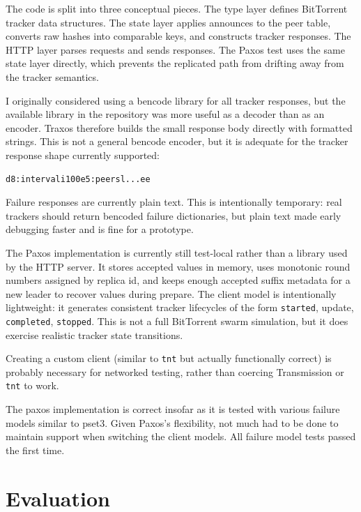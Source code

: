 \documentclass[letterpaper,twocolumn,10pt]{article}
\begin{document}
The code is split into three conceptual pieces. The type layer defines
BitTorrent tracker data structures. The state layer applies announces to
the peer table, converts raw hashes into comparable keys, and constructs
tracker responses. The HTTP layer parses requests and sends responses. The
Paxos test uses the same state layer directly, which prevents the
replicated path from drifting away from the tracker semantics.

I originally considered using a bencode library for all tracker responses,
but the available library in the repository was more useful as a decoder
than as an encoder. Traxos therefore builds the small response body
directly with formatted strings. This is not a general bencode encoder, but
it is adequate for the tracker response shape currently supported:

\begin{verbatim}
d8:intervali100e5:peersl...ee
\end{verbatim}

\noindent
Failure responses are currently plain text. This is intentionally temporary:
real trackers should return bencoded failure dictionaries, but plain text
made early debugging faster and is fine for a prototype.

The Paxos implementation is currently still test-local rather than a
library used by the HTTP server. It stores accepted values in memory, uses
monotonic round numbers assigned by replica id, and keeps enough accepted
suffix metadata for a new leader to recover values during prepare. The
client model is intentionally lightweight: it generates consistent tracker
lifecycles of the form \texttt{started}, update, \texttt{completed},
\texttt{stopped}. This is not a full BitTorrent swarm simulation, but it
does exercise realistic tracker state transitions.

Creating a custom client (similar to \texttt{tnt} but actually functionally
correct) is probably necessary for networked testing, rather than coercing
Transmission or \texttt{tnt} to work.

The paxos implementation is correct insofar as it is tested with various failure
models similar to pset3. Given Paxos's flexibility, not much had to be done to
maintain support when switching the client models. All failure model tests
passed the first time.

\section{Evaluation}
\end{document}
